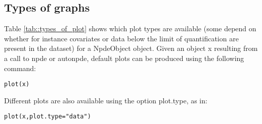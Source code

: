 \documentclass[11pt,a4paper]{report}
\begin{document}
\subsection{ Types of graphs}



Table \ref{tab::types_of_plot} shows which plot types are available (some depend on whether for instance covariates or data below the limit of quantification are present in the dataset) for a {\sf NpdeObject} object. Given an object {\sf x} resulting from a call to {\sf npde} or {\sf autonpde}, default plots can be produced using the following command:

\begin{lstlisting}
plot(x)
\end{lstlisting}
Different plots are also available using the option {\sf plot.type}, as in:
\begin{lstlisting}
plot(x,plot.type="data")
\end{lstlisting} 
\end{document}
